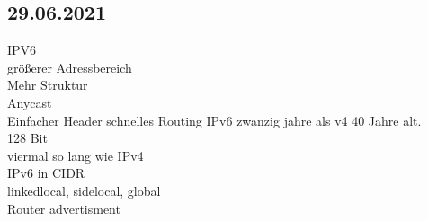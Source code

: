 \documentclass{article}
\begin{document}
	\subsection*{29.06.2021}
	IPV6 \\
	größerer Adressbereich \\
	Mehr Struktur \\
	Anycast \\
	Einfacher Header schnelles Routing
	IPv6 zwanzig jahre als v4 40 Jahre alt. \\
	128 Bit \\
	viermal so lang wie IPv4 \\
	IPv6 in CIDR \\
	linkedlocal, sidelocal, global \\
	Router advertisment \\
	
\end{document}
